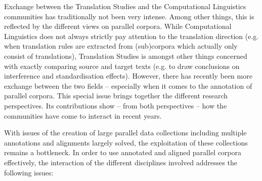 \documentclass[output=paper]{LSP/langsci}
\begin{document}
Exchange between the Translation Studies and the Computational Linguistics communities has traditionally not been very intense. Among other things, this is reflected by the different views on parallel corpora. While Computational Linguistics does not always strictly pay attention to the translation direction (e.g. when translation rules are extracted from (sub)corpora which actually only consist of translations), Translation Studies is amongst other things concerned with exactly comparing source and target texts (e.g. to draw conclusions on interference and standardisation effects). However, there has recently been more exchange between the two fields -- especially when it comes to the annotation of parallel corpora. This special issue brings together the different research perspectives. Its contributions show -- from both perspectives -- how the communities have come to interact in recent years.

With issues of the creation of large parallel data collections including multiple annotations and alignments largely solved, the exploitation of these collections remains a bottleneck. In order to use annotated and aligned parallel corpora effectively, the interaction of the different disciplines involved addresses the following issues:
\end{document}
